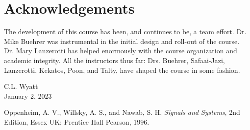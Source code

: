 \documentclass[]{book}
\theoremstyle{definition}
\numberwithin{section}{chapter}
\numberwithin{equation}{chapter}
\begin{document}
\section*{Acknowledgements}
The development of this course has been, and continues to be, a team effort. Dr. Mike Buehrer was instrumental in the initial design and roll-out of the course. Dr. Mary Lanzerotti has helped enormously with the course organization and academic integrity. All the instructors thus far: Drs. Buehrer, Safaai-Jazi, Lanzerotti, Kekatos, Poon, and Talty, have shaped the course in some fashion.

\vspace{2em}
\begin{flushright}
C.L. Wyatt\\
January 2, 2023
\end{flushright}


\tableofcontents
\mainmatter
























\appendix



\backmatter

\begin{thebibliography}{9}

  Oppenheim, A. V., Willsky, A. S., and Nawab, S. H, \textit{Signals and Systems}, 2nd Edition, Essex UK: Prentice Hall Pearson, 1996.

\end{thebibliography}

\printindex
\end{document}
